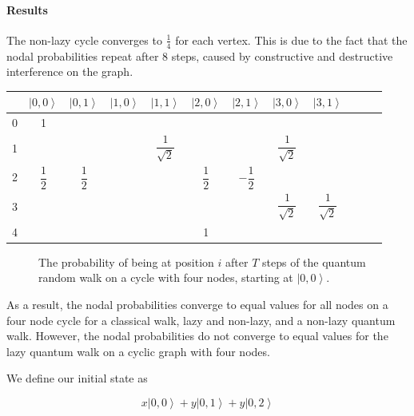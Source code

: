 \documentclass[a0,portrait]{a0poster}
\newcommand{\ket}[1]{\left| #1\right\rangle}
\begin{document}
\begin{center}
{\paragraph{Results}
The non-lazy cycle converges to $\frac{1}{4}$ for each vertex. This is due to the fact that the nodal probabilities repeat after 8 steps, caused by constructive and destructive interference on the graph.

\begin{center}
\small
\begin{tabular}{|c||c|c|c|c|c|c|c|c|c|c|c|}
\hline 
& $\ket{0,0}$ & $\ket{0,1}$ & $\ket{1,0}$ & $\ket{1,1}$ & $\ket{2,0}$ & $\ket{2,1}$ & $\ket{3,0}$ & $\ket{3,1}$ \\
\hline \hline
\hspace*{\fill} 0 \hspace*{\fill} & 1  &  &  &  &  &  & & \\
\hline 
1 &  &  &  &  
$\dfrac{ 1 }{ \sqrt{2} }$ & & &
$\dfrac{ 1 }{ \sqrt{2} }$  & 
\hspace*{\fill} \\
\hline 
2 &  
$\dfrac{ 1 }{ 2 }$ & 
$\dfrac{ 1 }{ 2 }$ & & &
$\dfrac{ 1 }{ 2 }$ & 
$-\dfrac{ 1 }{ 2 }$ & & &
\hspace*{\fill} \\
\hline 
3 & & & & & & & 
$\dfrac{ 1 }{ \sqrt{2} }$ & 
$\dfrac{ 1 }{ \sqrt{2} }$
\hspace*{\fill} \\
\hline
\hspace*{\fill} 4 \hspace*{\fill} &  &  &  &  & 1 &  & & \\
\hline 
\end{tabular}
\end{center}

\begin{figure}
\caption{The probability of being at position $i$ after $T$ steps of the quantum random walk on a cycle with four nodes, starting at $\ket{0,0}$.}
\label{quan_ti}
\end{figure}    

As a result, the nodal probabilities converge to equal values for all nodes on a four node cycle for a classical walk, lazy and non-lazy, and a non-lazy quantum walk. However, the nodal probabilities do not converge to equal values for the lazy quantum walk on a cyclic graph with four nodes.

We define our initial state as 

\begin{equation}
x\ket{0,0}+y\ket{0,1}+y\ket{0,2}
\end{equation}

}
\end{center}
\end{document}
